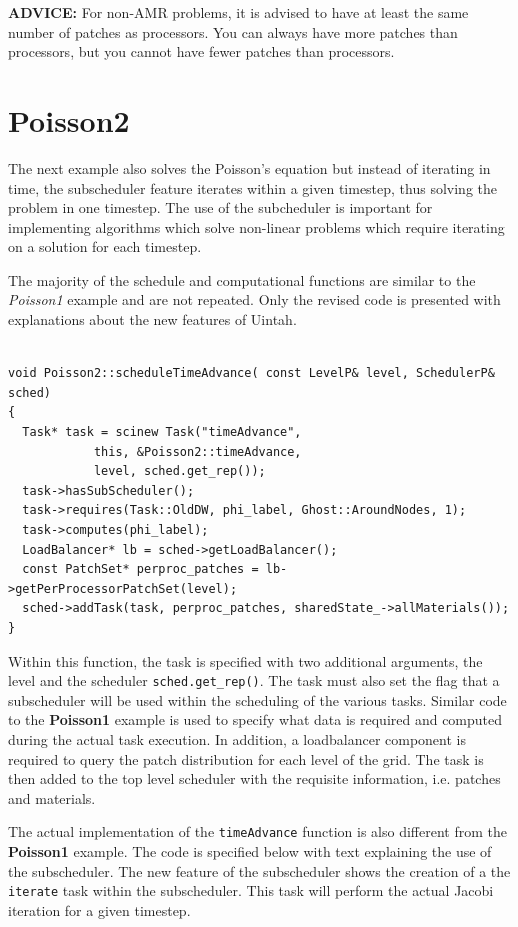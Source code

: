\documentclass[12pt]{report}
\begin{document}
\textbf{ADVICE:} For non-AMR problems, it is advised to have at least
the same number of patches as processors.  You can always have more
patches than processors, but you cannot have fewer patches than
processors.


\section{Poisson2}

The next example also solves the Poisson's equation but instead of
iterating in time, the subscheduler feature iterates within a given
timestep, thus solving the problem in one timestep.  The use of the
subcheduler is important for implementing algorithms which solve
non-linear problems which require iterating on a solution for each
timestep.

The majority of the schedule and computational functions are similar
to the \emph{Poisson1} example and are not repeated.  Only the revised
code is presented with explanations about the new features of Uintah.

\begin{Verbatim}[fontsize=\footnotesize]

void Poisson2::scheduleTimeAdvance( const LevelP& level, SchedulerP& sched)
{
  Task* task = scinew Task("timeAdvance",
			this, &Poisson2::timeAdvance,
			level, sched.get_rep());
  task->hasSubScheduler();
  task->requires(Task::OldDW, phi_label, Ghost::AroundNodes, 1);
  task->computes(phi_label);
  LoadBalancer* lb = sched->getLoadBalancer();
  const PatchSet* perproc_patches = lb->getPerProcessorPatchSet(level);
  sched->addTask(task, perproc_patches, sharedState_->allMaterials());
}

\end{Verbatim}

Within this function, the task is specified with two additional
arguments, the level and the scheduler \texttt{sched.get\_rep()}.  The
task must also set the flag that a subscheduler will be used within
the scheduling of the various tasks.  Similar code to the
\textbf{Poisson1} example is used to specify what data is required and
computed during the actual task execution.  In addition, a
loadbalancer component is required to query the patch distribution for
each level of the grid.  The task is then added to the top level
scheduler with the requisite information, i.e. patches and materials.

The actual implementation of the \texttt{timeAdvance} function is also
different from the \textbf{Poisson1} example.  The code is specified
below with text explaining the use of the subscheduler.  The new
feature of the subscheduler shows the creation of a the
\texttt{iterate} task within the subscheduler.  This task will perform
the actual Jacobi iteration for a given timestep.
\end{document}
